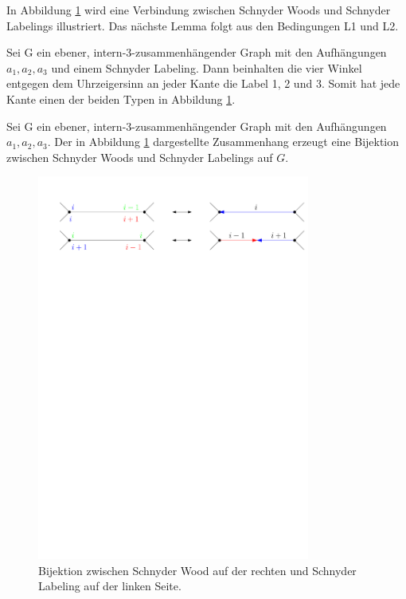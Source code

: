 In Abbildung \ref{schnyder_bij} wird eine Verbindung zwischen Schnyder Woods und Schnyder Labelings illustriert. Das nächste Lemma folgt aus den Bedingungen L1 und L2.

\begin{lemma}\label{lem_sl}
Sei G ein ebener, intern-3-zusammenhängender Graph mit den Aufhängungen $a_1,a_2,a_3$ und einem Schnyder Labeling. Dann beinhalten die vier Winkel entgegen dem Uhrzeigersinn an jeder Kante die Label 1, 2 und 3. Somit hat jede Kante einen der beiden Typen in Abbildung \ref{schnyder_bij}.
\end{lemma}

\begin{theorem}\label{theo_schnyder_bij}
Sei G ein ebener, intern-3-zusammenhängender Graph mit den Aufhängungen $a_1,a_2,a_3$. Der in Abbildung \ref{schnyder_bij} dargestellte Zusammenhang erzeugt eine Bijektion zwischen Schnyder Woods und Schnyder Labelings auf $G$.
\end{theorem}

\begin{figure}[h]
	\centering
  \includegraphics[width=0.8\textwidth]{schnyder_bij.pdf}
	\caption{Bijektion zwischen Schnyder Wood auf der rechten und Schnyder Labeling auf der linken Seite.}
	\label{schnyder_bij}
\end{figure}

